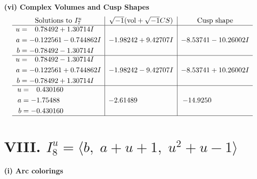 \documentclass[1p]{elsarticle_modified}
\theoremstyle{definition}
\newcommand{\I}{\sqrt{-1}}
\begin{document}
\newpage\flushleft \textbf{(vi) Complex Volumes and Cusp Shapes}
$$\begin{array}{c|c|c}  
\text{Solutions to }I^u_{7}& \I (\text{vol} + \sqrt{-1}CS) & \text{Cusp shape}\\
 \hline 
\begin{aligned}
u &= \phantom{-}0.78492 + 1.30714 I \\
a &= -0.122561 - 0.744862 I \\
b &= -0.78492 - 1.30714 I\end{aligned}
 & -1.98242 + 9.42707 I & -8.53741 - 10.26002 I \\ \hline\begin{aligned}
u &= \phantom{-}0.78492 - 1.30714 I \\
a &= -0.122561 + 0.744862 I \\
b &= -0.78492 + 1.30714 I\end{aligned}
 & -1.98242 - 9.42707 I & -8.53741 + 10.26002 I \\ \hline\begin{aligned}
u &= \phantom{-}0.430160\phantom{ +0.000000I} \\
a &= -1.75488\phantom{ +0.000000I} \\
b &= -0.430160\phantom{ +0.000000I}\end{aligned}
 & -2.61489\phantom{ +0.000000I} & -14.9250\phantom{ +0.000000I}\\
 \hline 
 \end{array}$$\newpage\newpage\renewcommand{\arraystretch}{1}
\centering \section*{VIII. $I^u_{8}= \langle b,\;a+u+1,\;u^2+u-1 \rangle$}
\flushleft \textbf{(i) Arc colorings}\\
\end{document}
